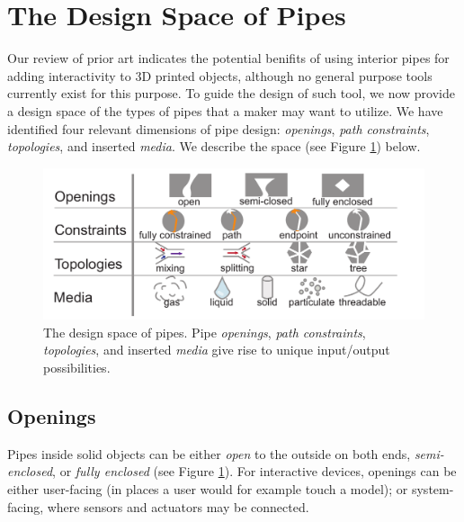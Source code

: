 
\section{The Design Space of Pipes}
Our review of prior art indicates the potential benifits of using interior pipes for adding interactivity to 3D printed objects, although no general purpose tools currently exist for this purpose. To guide the design of such tool, we now provide a design space of the types of pipes that a maker may want to utilize. We have identified four relevant dimensions of pipe design: \emph{openings}, \emph{path constraints}, \emph{topologies}, and inserted \emph{media}.  We describe the space (see Figure \ref{fig:pipespace}) below.

\begin{figure}[t]
\centering
    \includegraphics[width=1.0\columnwidth]{figures/tubespace.pdf}
\caption{The design space of pipes.  Pipe \emph{openings}, \emph{path constraints}, \emph{topologies}, and inserted \emph{media} give rise to unique input/output possibilities.}
\label{fig:pipespace}
\end{figure}

\subsection{Openings}
Pipes inside solid objects can be either \emph{open} to the outside on both ends, \emph{semi-enclosed}, or \emph{fully enclosed} (see Figure \ref{fig:pipespace}). For interactive devices, openings can be either user-facing (in places a user would for example touch a model); or system-facing, where sensors and actuators may be connected.


